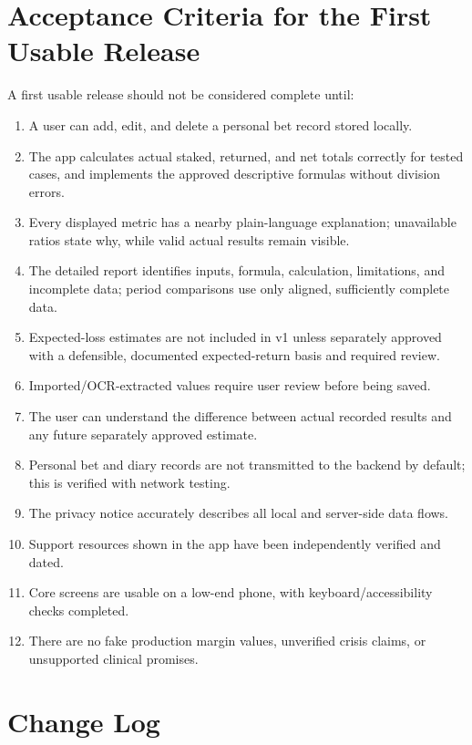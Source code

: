 \documentclass[11pt,a4paper]{article}
\begin{document}
\section{Acceptance Criteria for the First Usable Release}

A first usable release should not be considered complete until:
\begin{enumerate}
  \item A user can add, edit, and delete a personal bet record stored locally.
  \item The app calculates actual staked, returned, and net totals correctly for tested cases, and implements the approved descriptive formulas without division errors.
  \item Every displayed metric has a nearby plain-language explanation; unavailable ratios state why, while valid actual results remain visible.
  \item The detailed report identifies inputs, formula, calculation, limitations, and incomplete data; period comparisons use only aligned, sufficiently complete data.
  \item Expected-loss estimates are not included in v1 unless separately approved with a defensible, documented expected-return basis and required review.
  \item Imported/OCR-extracted values require user review before being saved.
  \item The user can understand the difference between actual recorded results and any future separately approved estimate.
  \item Personal bet and diary records are not transmitted to the backend by default; this is verified with network testing.
  \item The privacy notice accurately describes all local and server-side data flows.
  \item Support resources shown in the app have been independently verified and dated.
  \item Core screens are usable on a low-end phone, with keyboard/accessibility checks completed.
  \item There are no fake production margin values, unverified crisis claims, or unsupported clinical promises.
\end{enumerate}

\section{Change Log}
\end{document}
